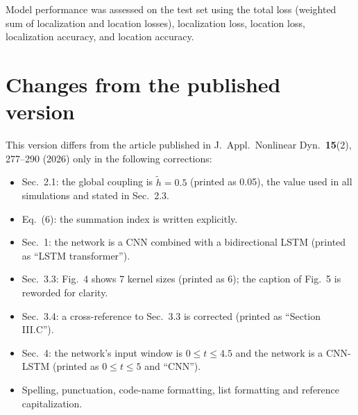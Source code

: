 \documentclass[11pt]{article}
\begin{document}
Model performance was assessed on the test set using the total loss (weighted sum of localization and location losses), localization loss, location loss, localization accuracy, and location accuracy.  


\section*{Changes from the published version}
This version differs from the article published in J.\ Appl.\ Nonlinear Dyn.\ \textbf{15}(2), 277--290 (2026) only in the following corrections:
\begin{itemize}
\item Sec.~2.1: the global coupling is $\tilde{h}=0.5$ (printed as 0.05), the value used in all simulations and stated in Sec.~2.3.
\item Eq.~(6): the summation index is written explicitly.
\item Sec.~1: the network is a CNN combined with a bidirectional LSTM (printed as ``LSTM transformer'').
\item Sec.~3.3: Fig.~4 shows 7 kernel sizes (printed as 6); the caption of Fig.~5 is reworded for clarity.
\item Sec.~3.4: a cross-reference to Sec.~3.3 is corrected (printed as ``Section III.C'').
\item Sec.~4: the network's input window is $0\le t\le 4.5$ and the network is a CNN-LSTM (printed as $0\le t\le 5$ and ``CNN'').
\item Spelling, punctuation, code-name formatting, list formatting and reference capitalization.
\end{itemize}



\end{document}
